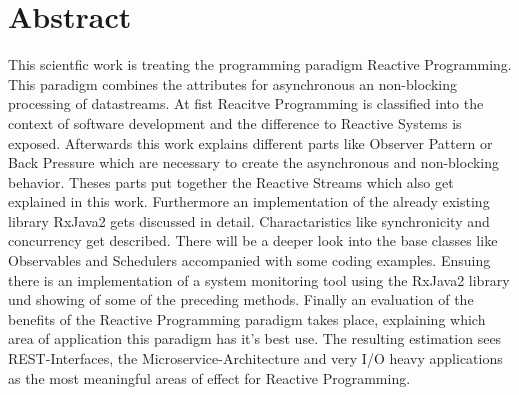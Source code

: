 \section*{Abstract} %
\label{cha:abtract}
This scientfic work is treating the programming paradigm Reactive Programming. This paradigm combines the attributes for asynchronous an non-blocking processing of datastreams. At fist Reacitve Programming is classified into the context of software development and the difference to Reactive Systems is exposed. Afterwards this work explains different parts like Observer Pattern or Back Pressure which are necessary to create the asynchronous and non-blocking behavior. Theses parts put together the Reactive Streams which also get explained in this work. Furthermore an implementation of the already existing library RxJava2 gets discussed in detail. Charactaristics like synchronicity and concurrency get described. There will be a deeper look into the base classes like Observables and Schedulers accompanied with some coding examples. Ensuing there is an implementation of a system monitoring tool using the RxJava2 library und showing of some of the preceding methods. Finally an evaluation of the benefits of the Reactive Programming paradigm takes place, explaining which area of application this paradigm has it's best use. The resulting estimation sees REST-Interfaces, the Microservice-Architecture and very I/O heavy applications as the most meaningful areas of effect for Reactive Programming.
 

